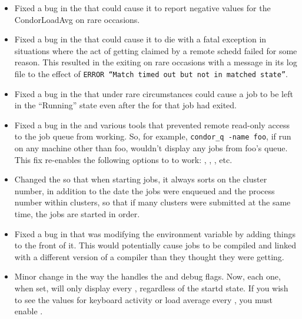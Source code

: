 \begin{itemize}
\item Fixed a bug in the  that could cause it to
report negative values for the CondorLoadAvg on rare occasions. 

\item Fixed a bug in the  that could cause it to die
with a fatal exception in situations where the act of getting claimed
by a remote schedd failed for some reason.  
This resulted in the  exiting on rare occasions with a
message in its log file to the effect of \texttt{ERROR ``Match timed
out but not in matched state''}.

\item Fixed a bug in the  that under rare circumstances
could cause a job to be left in the ``Running'' state even after the
 for that job had exited.

\item Fixed a bug in the  and various tools that
prevented remote read-only access to the job queue from working.
So, for example, \texttt{condor\_q -name foo}, if run on any machine
other than foo, wouldn't display any jobs from foo's queue. 
This fix re-enables the following options to  to work:
, , , etc.

\item Changed the  so that when starting jobs, it
always sorts on the cluster number, in addition to the date the jobs
were enqueued and the process number within clusters, so that if many
clusters were submitted at the same time, the jobs are started in
order.

\item Fixed a bug in  that was modifying the
 environment variable by adding things to the front of it.
This would potentially cause jobs to be compiled and linked with a
different version of a compiler than they thought they were getting.  

\item Minor change in the way the  handles the
 and  debug flags.  
Now, each one, when set, will only display every
, regardless of the startd state.
If you wish to see the values for keyboard activity or load average
every , you must enable . 

\end{itemize}

